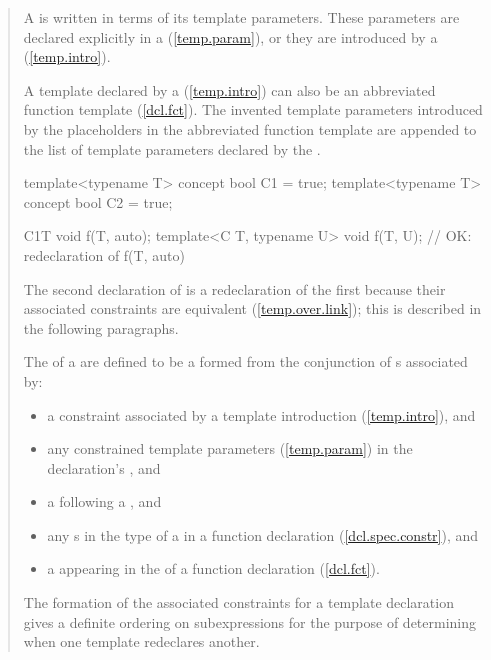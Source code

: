 \begin{quote}
\setcounter{Paras}{6}
\pnum
A  is written in terms of its template 
parameters. These parameters are declared explicitly in a 
 (\ref{temp.param}), or they are
introduced by a  (\ref{temp.intro}).


\pnum
A template declared by a 
(\ref{temp.intro}) can also be an abbreviated function template (\ref{dcl.fct}). 
% 
The invented
template parameters introduced by the placeholders in the abbreviated
function template are appended to the list of template parameters declared
by the .

\enterexample
\begin{codeblock}
template<typename T> concept bool C1 = true;
template<typename T> concept bool C2 = true;

C1{T} void f(T, auto);
template<C T, typename U> void f(T, U); // OK: redeclaration of f(T, auto)
\end{codeblock}
\enternote
  The second declaration of  is a redeclaration of the first
  because their associated constraints are equivalent (\ref{temp.over.link}); 
  this is described in the following paragraphs.
\exitnote
\exitexample

\pnum
The  of a  are 
defined to be a  formed from the conjunction 
of s associated by:
% 
\begin{itemize}
\item a constraint associated by a template introduction 
(\ref{temp.intro}), and

\item any constrained template parameters (\ref{temp.param}) in the 
declaration's , and

\item a  following a
, and

\item any s in the type of a 
 in a function declaration 
(\ref{dcl.spec.constr}), and

\item a  appearing in the  
of a function declaration (\ref{dcl.fct}).
\end{itemize}
% 
The formation of the associated constraints for a template declaration
gives a definite ordering on subexpressions for the purpose of determining
when one template redeclares another.


\end{quote}
